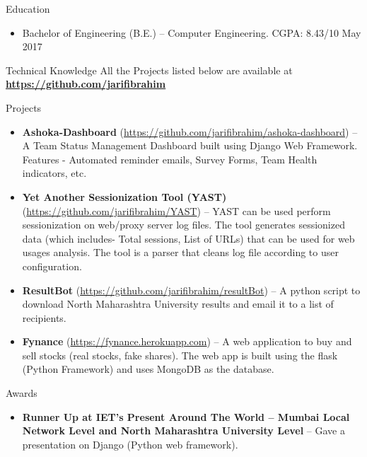 \documentclass[]{mcdowellcv}
\begin{document}
	\begin{cvsection}{Education}
		\begin{cvsubsection}{}{}{}
			\begin{itemize}
				\item Bachelor of Engineering (B.E.) -- Computer Engineering. CGPA: 8.43/10 \hfill May 2017
			\end{itemize}
		\end{cvsubsection}
	\end{cvsection}
	\begin{cvsection}{Technical Knowledge}{}{}
	All the Projects listed below are available at     \textbf{\url{https://github.com/jarifibrahim}}   \\     \begin{cvsubsection}{Projects}{}{}
			\begin{itemize}
			    
			    \item \textbf{Ashoka-Dashboard} (\url{https://github.com/jarifibrahim/ashoka-dashboard}) -- A Team Status Management Dashboard built using Django Web Framework. Features - Automated reminder emails, Survey Forms, Team Health indicators, etc.
			    
				\item \textbf{Yet Another Sessionization Tool (YAST)}
				(\url{https://github.com/jarifibrahim/YAST}) -- YAST can be used perform sessionization on web/proxy server log files. The tool generates sessionized data (which includes- Total sessions, List of URLs) that can be used for web usages analysis. The tool is a parser that cleans log file according to user configuration.
				
	    		\item \textbf{ResultBot}                (\url{https://github.com/jarifibrahim/resultBot}) -- A python script to download North Maharashtra University results and email it to a list of recipients. 
			    
			    \item \textbf{Fynance} (\url{https://fynance.herokuapp.com})
			        -- A web application to buy and sell stocks (real stocks, fake shares). The web app is built using the flask (Python Framework) and uses MongoDB as the database.
			\end{itemize}
		\end{cvsubsection}
	\end{cvsection}
	
	\begin{cvsection}{Awards}
		\begin{cvsubsection}{}{}{}	
			\begin{itemize}
				\item \textbf{Runner Up at IET's Present Around The World -- Mumbai Local Network Level and North Maharashtra University Level} -- Gave a presentation on Django (Python web framework).
			\end{itemize}
		\end{cvsubsection}
	\end{cvsection}
	
\end{document}
